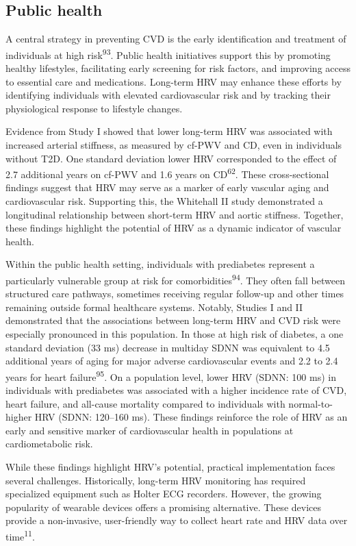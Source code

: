 \documentclass[
  a4paper,
  headsepline=true,
  open=any]{scrbook}
\begin{document}
\hypertarget{public-health}{%
\subsection{Public health}\label{public-health}}

A central strategy in preventing CVD is the early identification and
treatment of individuals at high risk\textsuperscript{93}. Public health
initiatives support this by promoting healthy lifestyles, facilitating
early screening for risk factors, and improving access to essential care
and medications. Long-term HRV may enhance these efforts by identifying
individuals with elevated cardiovascular risk and by tracking their
physiological response to lifestyle changes.

Evidence from Study I showed that lower long-term HRV was associated
with increased arterial stiffness, as measured by cf-PWV and CD, even in
individuals without T2D. One standard deviation lower HRV corresponded
to the effect of 2.7 additional years on cf-PWV and 1.6 years on
CD\textsuperscript{62}. These cross-sectional findings suggest that HRV
may serve as a marker of early vascular aging and cardiovascular risk.
Supporting this, the Whitehall II study demonstrated a longitudinal
relationship between short-term HRV and aortic stiffness. Together,
these findings highlight the potential of HRV as a dynamic indicator of
vascular health.

Within the public health setting, individuals with prediabetes represent
a particularly vulnerable group at risk for
comorbidities\textsuperscript{94}. They often fall between structured
care pathways, sometimes receiving regular follow-up and other times
remaining outside formal healthcare systems. Notably, Studies I and II
demonstrated that the associations between long-term HRV and CVD risk
were especially pronounced in this population. In those at high risk of
diabetes, a one standard deviation (33 ms) decrease in multiday SDNN was
equivalent to 4.5 additional years of aging for major adverse
cardiovascular events and 2.2 to 2.4 years for heart
failure\textsuperscript{95}. On a population level, lower HRV (SDNN: 100
ms) in individuals with prediabetes was associated with a higher
incidence rate of CVD, heart failure, and all-cause mortality compared
to individuals with normal-to-higher HRV (SDNN: 120--160 ms). These
findings reinforce the role of HRV as an early and sensitive marker of
cardiovascular health in populations at cardiometabolic risk.

While these findings highlight HRV's potential, practical implementation
faces several challenges. Historically, long-term HRV monitoring has
required specialized equipment such as Holter ECG recorders. However,
the growing popularity of wearable devices offers a promising
alternative. These devices provide a non-invasive, user-friendly way to
collect heart rate and HRV data over time\textsuperscript{11}.
\end{document}
